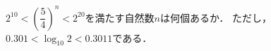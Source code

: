 \documentclass[../../main.tex]{subfiles}
\begin{document}
$\displaystyle 2^{10}<(\dfrac{5}{4})^n<2^{20}$を満たす自然数$n$は何個あるか．
ただし，$0.301<\log_{10}2<0.3011$である．
\end{document}
